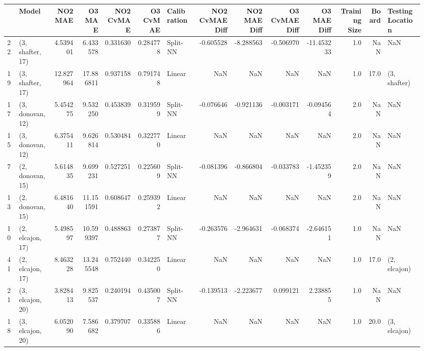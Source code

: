 \begin{tabular}{llrrrrlrrrrrrl}
\toprule
{} &             Model &    NO2 MAE &     O3 MAE &  NO2 CvMAE &  O3 CvMAE & Calibration &  NO2 CvMAE Diff &  NO2 MAE Diff &  O3 CvMAE Diff &  O3 MAE Diff &  Training Size &  Board & Testing Location \\
\midrule
22 &  (3, shafter, 17) &   4.539401 &   6.433578 &   0.331630 &  0.284778 &    Split-NN &       -0.605528 &     -8.288563 &      -0.506970 &   -11.453233 &            1.0 &    NaN &              NaN \\
19 &  (3, shafter, 17) &  12.827964 &  17.886811 &   0.937158 &  0.791748 &      Linear &             NaN &           NaN &            NaN &          NaN &            1.0 &   17.0 &     (3, shafter) \\
17 &  (3, donovan, 12) &   5.454275 &   9.532250 &   0.453839 &  0.319599 &    Split-NN &       -0.076646 &     -0.921136 &      -0.003171 &    -0.094564 &            2.0 &    NaN &              NaN \\
15 &  (3, donovan, 12) &   6.375411 &   9.626814 &   0.530484 &  0.322770 &      Linear &             NaN &           NaN &            NaN &          NaN &            2.0 &    NaN &              NaN \\
7  &  (2, donovan, 15) &   5.614835 &   9.699231 &   0.527251 &  0.225609 &    Split-NN &       -0.081396 &     -0.866804 &      -0.033783 &    -1.452359 &            2.0 &    NaN &              NaN \\
13 &  (2, donovan, 15) &   6.481640 &  11.151591 &   0.608647 &  0.259392 &      Linear &             NaN &           NaN &            NaN &          NaN &            2.0 &    NaN &              NaN \\
10 &  (2, elcajon, 17) &   5.498597 &  10.599397 &   0.488863 &  0.273877 &    Split-NN &       -0.263576 &     -2.964631 &      -0.068374 &    -2.646151 &            1.0 &    NaN &              NaN \\
41 &  (2, elcajon, 17) &   8.463228 &  13.245548 &   0.752440 &  0.342250 &      Linear &             NaN &           NaN &            NaN &          NaN &            1.0 &   17.0 &     (2, elcajon) \\
21 &  (3, elcajon, 20) &   3.828413 &   9.825537 &   0.240194 &  0.435007 &    Split-NN &       -0.139513 &     -2.223677 &       0.099121 &     2.238855 &            1.0 &    NaN &              NaN \\
18 &  (3, elcajon, 20) &   6.052090 &   7.586682 &   0.379707 &  0.335886 &      Linear &             NaN &           NaN &            NaN &          NaN &            1.0 &   20.0 &     (3, elcajon) \\

\end{tabular}
